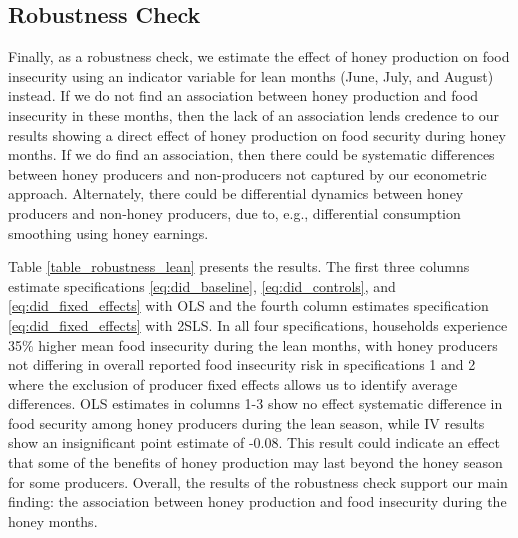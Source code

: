 \documentclass[../main.tex]{subfiles}
\begin{document}
\subsection{Robustness Check}
Finally, as a robustness check, we estimate the effect of honey production on food insecurity using an indicator variable for lean months (June, July, and August) instead. If we do not find an association between honey production and food
insecurity in these months, then the lack of an association lends credence to our  results showing a direct effect of honey production on food security during honey months. If we do find an association, then there could be systematic differences between honey producers and non-producers not captured by our econometric approach.
Alternately, there could be differential dynamics between honey producers and non-honey producers, due to, e.g., differential consumption smoothing using honey earnings.

Table \ref{table_robustness_lean} presents the results. The first three columns estimate specifications \ref{eq:did_baseline}, \ref{eq:did_controls}, and \ref{eq:did_fixed_effects}
with OLS and the fourth column estimates specification \ref{eq:did_fixed_effects} with 2SLS.  In all four specifications, households experience 35\% higher mean food insecurity during the lean months, with  honey producers not differing in overall reported food insecurity risk in specifications 1 and 2 where the exclusion  of producer fixed effects allows us to identify average differences. OLS estimates in columns 1-3 show no effect systematic difference in food security among honey producers during the lean season, while IV results show an insignificant  point estimate of -0.08. This result could indicate an effect that some of the benefits of honey production may last beyond the honey season for some producers.
Overall, the results of the robustness check support our main finding: the
association between honey production and food insecurity during the
honey months. 
\end{document}
